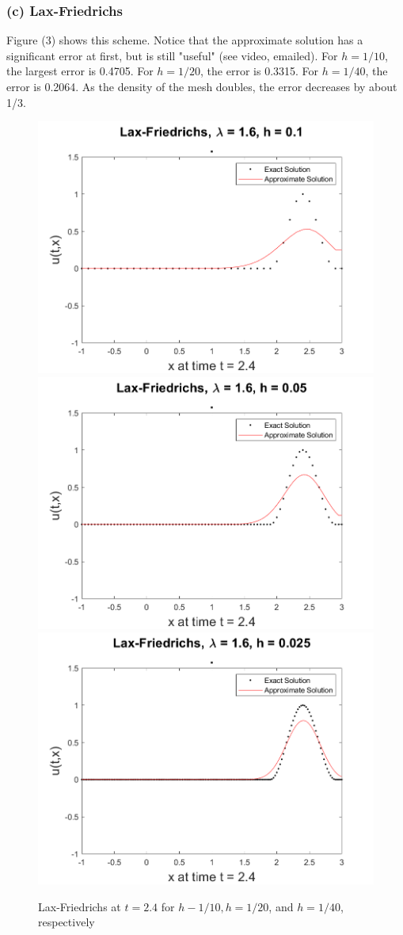 \documentclass[12pt]{article}
\begin{document}
\subsubsection*{(c) Lax-Friedrichs}

Figure (3) shows this scheme. Notice that the approximate solution has a significant error at first, but is still "useful" (see video, emailed). For $h=1/10$, the largest error is 0.4705. For $h=1/20$, the error is 0.3315. For $h=1/40$, the error is 0.2064. As the density of the mesh doubles, the error decreases by about 1/3.

\begin{figure}
	\centering
	\includegraphics[width=.6\linewidth]{./code/c_lax_friedrichs_1_10th.png}	\includegraphics[width=.6\linewidth]{./code/c_lax_friedrichs_1_20th.png}
	\includegraphics[width=.6\linewidth]{./code/c_lax_friedrichs_1_40th.png}
	\caption{Lax-Friedrichs at $t=2.4$ for $h-1/10, h=1/20$, and $h=1/40$, respectively}
\end{figure}
\end{document}
